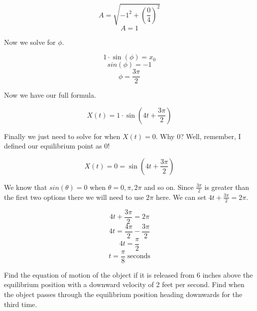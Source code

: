 \documentclass[10pt,letterpaper]{amspset}
\begin{document}
\begin{solution}[(b)]
    \[A = \sqrt{-1^2 + \left( \frac{0}{4} \right)^2}\]
    \[A = 1\]
    
    Now we solve for $\phi$.
    
    \[1 \cdot \sin(\phi) = x_0\]
    \[sin(\phi) = -1\]
    \[\phi = \frac{3\pi}{2}\]
    
    Now we have our full formula.
    
    \[\boxed{X(t) = 1 \cdot \sin(4t + \frac{3\pi}{2})}\]
    
    Finally we just need to solve for when $X(t) = 0$. Why 0? Well, remember, I defined our equilibrium point as 0! 
    
    \[X(t) = 0 = \sin(4t + \frac{3\pi}{2})\]
    
    We know that $sin(\theta) = 0$ when $\theta = 0, \pi, 2\pi$ and so on. Since $\frac{3\pi}{2}$ is greater than the first two options there we will need to use $2\pi$ here. We can set $4t + \frac{3\pi}{2} = 2\pi$.
    
    \[4t + \frac{3\pi}{2} = 2\pi\]
    \[4t = \frac{4\pi}{2} - \frac{3\pi}{2}\]
    \[4t = \frac{\pi}{2}\]
    \[\boxed{ t = \frac{\pi}{8} \; \text{seconds} }\]
\end{solution}

\pagebreak

\begin{problem}[6c]
    Find the equation of motion of the object if it is released from 6 inches above the equilibrium position with a downward velocity of 2 feet per second. Find when the object passes through the equilibrium position heading downwards for the third time.
\end{problem}
\end{document}
